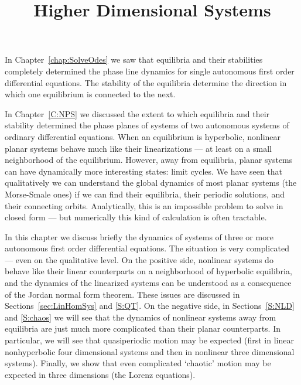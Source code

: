 \documentclass{ximera}
\title{Higher Dimensional Systems}
\begin{document}
\begin{abstract}
\end{abstract}
\maketitle


\label{C:HDS}

\normalsize

In Chapter~\ref{chap:SolveOdes} we saw that equilibria and their 
stabilities completely determined the phase line dynamics for single
autonomous first order differential equations.  The stability of the
equilibria determine the direction in which one equilibrium is connected 
to the next.

In Chapter~\ref{C:NPS} we discussed the extent to which equilibria and 
their stability determined the phase planes of systems of two autonomous 
systems of ordinary differential equations.  When an equilibrium is 
hyperbolic, nonlinear planar systems behave much like their linearizations 
--- at least on a small neighborhood of the equilibrium.  However, away 
from equilibria, planar systems can have dynamically more interesting 
states: limit cycles.  We have seen that qualitatively we can understand the
global dynamics of most planar systems (the Morse-Smale ones) if we can find 
their equilibria, their periodic
solutions, and their connecting orbits.  Analytically, this is an impossible
problem to solve in closed form --- but numerically this kind of calculation
is often tractable.

In this chapter we discuss briefly the dynamics of systems of three or
more autonomous first order differential equations.  The situation is
very complicated --- even on the qualitative level.  On the positive
side, nonlinear systems do behave like their linear counterparts on a
neighborhood of hyperbolic equilibria, and the dynamics of the linearized
systems can be understood as a consequence of the Jordan normal form theorem.
These issues are discussed in Sections~\ref{sec:LinHomSys} and \ref{S:QT}.  
On the negative side, in Sections~\ref{S:NLD} and \ref{S:chaos} we will see 
that the dynamics of nonlinear systems away from equilibria are just much 
more complicated than their planar counterparts.  In particular, we will see 
that quasiperiodic motion may be expected (first in linear nonhyperbolic four 
dimensional systems and then in nonlinear three dimensional systems).  
Finally, we show that even complicated `chaotic' motion may be expected in 
three dimensions (the Lorenz equations). 
\end{document}
